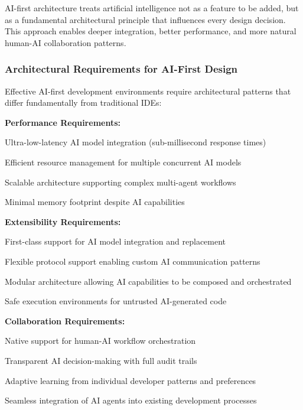 \begin{infobox}[title=Architectural Philosophy: Foundation vs. Retrofit]
AI-first architecture treats artificial intelligence not as a feature to be added, but as a fundamental architectural principle that influences every design decision. This approach enables deeper integration, better performance, and more natural human-AI collaboration patterns.
\end{infobox}

\subsubsection{Architectural Requirements for AI-First Design}

Effective AI-first development environments require architectural patterns that differ fundamentally from traditional IDEs:

\textbf{Performance Requirements:}
\begin{compactlist}
    \item Ultra-low-latency AI model integration (sub-millisecond response times)
    \item Efficient resource management for multiple concurrent AI models
    \item Scalable architecture supporting complex multi-agent workflows
    \item Minimal memory footprint despite AI capabilities
\end{compactlist}

\textbf{Extensibility Requirements:}
\begin{compactlist}
    \item First-class support for AI model integration and replacement
    \item Flexible protocol support enabling custom AI communication patterns
    \item Modular architecture allowing AI capabilities to be composed and orchestrated
    \item Safe execution environments for untrusted AI-generated code
\end{compactlist}

\textbf{Collaboration Requirements:}
\begin{compactlist}
    \item Native support for human-AI workflow orchestration
    \item Transparent AI decision-making with full audit trails
    \item Adaptive learning from individual developer patterns and preferences
    \item Seamless integration of AI agents into existing development processes
\end{compactlist}

